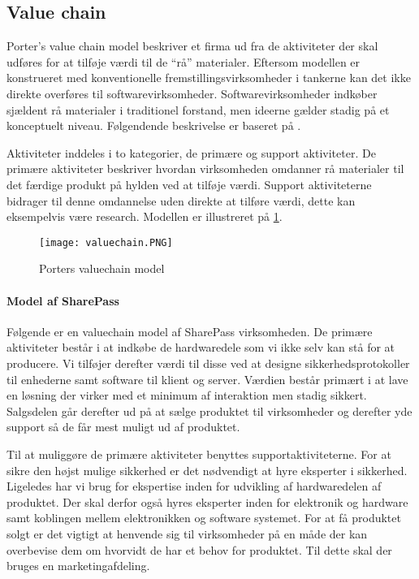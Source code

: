 \subsection{Value chain}\label{value_chain}


Porter's value chain model beskriver et firma ud fra de aktiviteter der skal udføres for at tilføje værdi til de ``rå'' materialer.
Eftersom modellen er konstrueret med konventionelle fremstillingsvirksomheder i tankerne kan det ikke direkte overføres til softwarevirksomheder.
Softwarevirksomheder indkøber sjældent rå materialer i traditionel forstand, men ideerne gælder stadig på et konceptuelt niveau.
Følgendende beskrivelse er baseret på \citet[p.~12]{rose2012software}.


Aktiviteter inddeles i to kategorier, de primære og support aktiviteter.
De primære aktiviteter beskriver hvordan virksomheden omdanner rå materialer til det færdige produkt på hylden ved at tilføje værdi.
Support aktiviteterne bidrager til denne omdannelse uden direkte at tilføre værdi, dette kan eksempelvis være research.
Modellen er illustreret på  \cref{valuechain}.

\begin{figure}[H]
	\texttt{[image: valuechain.PNG]}
	\caption{Porters valuechain model}
	\label{valuechain}
\end{figure}

\paragraph{Model af SharePass}
Følgende er en valuechain model af SharePass virksomheden.
De primære aktiviteter består i at indkøbe de hardwaredele som vi ikke selv kan stå for at producere.
Vi tilføjer derefter værdi til disse ved at designe sikkerhedsprotokoller til enhederne samt software til klient og server.
Værdien består primært i at lave en løsning der virker med et minimum af interaktion men stadig sikkert.
Salgsdelen går derefter ud på at sælge produktet til virksomheder og derefter yde support så de får mest muligt ud af produktet.

Til at muliggøre de primære aktiviteter benyttes supportaktiviteterne.
For at sikre den højst mulige sikkerhed er det nødvendigt at hyre eksperter i sikkerhed.
Ligeledes har vi brug for ekspertise inden for udvikling af hardwaredelen af produktet.
Der skal derfor også hyres eksperter inden for elektronik og hardware samt koblingen mellem elektronikken og software systemet.
For at få produktet solgt er det vigtigt at henvende sig til virksomheder på en måde der kan overbevise dem om hvorvidt de har et behov for produktet.
Til dette skal der bruges en marketingafdeling.

